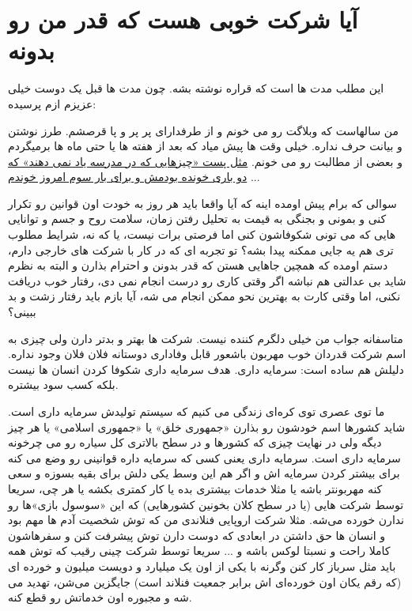 \section{آیا شرکت خوبی هست که قدر من رو بدونه}
این مطلب مدت ها است که قراره نوشته بشه. چون مدت ها قبل یک دوست خیلی عزیزم ازم پرسیده:
\begin{mdframed}
من سالهاست که وبلاگت رو می خونم و از طرفدارای پر پر و پا قرصشم. طرز نوشتن و بیانت حرف نداره. خیلی وقت ها پیش میاد که بعد از هفته ها یا حتی ماه ها برمیگردم و بعضی از مطالبت رو می خونم.
\href{http://jadi.net/2011/04/\%DA\%86\%DB\%8C\%D8\%B2\%D9\%87\%D8\%A7\%DB\%8C\%DB\%8C-\%DA\%A9\%D9\%87-\%D8\%AF\%D8\%B1-\%D9\%85\%D8\%AF\%D8\%B1\%D8\%B3\%D9\%87-\%DB\%8C\%D8\%A7\%D8\%AF-\%D9\%86\%D9\%85\%DB\%8C-\%D8\%AF\%D9\%87\%D9\%86\%D8\%AF/}{مثل پست «چیزهایی که در مدرسه یاد نمی دهند» که دو باری خونده بودمش و برای بار سوم امروز خوندم}
...

سوالی که برام پیش اومده اینه که آیا واقعا باید هر روز به خودت اون قوانین رو تکرار کنی و بمونی و بجنگی به قیمت به تحلیل رفتن زمان، سلامت روح و جسم و توانایی هایی که می تونی شکوفاشون کنی اما فرصتی برات نیست، یا که نه، شرایط مطلوب تری هم یه جایی ممکنه پیدا بشه؟
تو تجربه ای که در کار با شرکت های خارجی دارم، دستم اومده که همچین جاهایی هستن که قدر بدونن و احترام بذارن و البته به نظرم شاید بی عدالتی هم نباشه اگر وقتی کاری رو درست انجام نمی دی، رفتار خوب دریافت نکنی، اما وقتی کارت به بهترین نحو ممکن انجام می شه، آیا بازم باید رفتار زشت و بد ببینی؟
\end{mdframed}
متاسفانه جواب من خیلی دلگرم کننده نیست. شرکت ها بهتر و بدتر دارن ولی چیزی به اسم شرکت قدردان خوب مهربون باشعور قابل وفاداری دوستانه فلان فلان وجود نداره. دلیلش هم ساده است: سرمایه داری. هدف سرمایه داری شکوفا کردن انسان ها نیست بلکه کسب سود بیشتره.

ما توی عصری توی کره‌ای زندگی می کنیم که سیستم تولیدش سرمایه داری است. شاید کشورها اسم خودشون رو بذارن «جمهوری خلق» یا «جمهوری اسلامی» یا هر چیز دیگه ولی در نهایت چیزی که کشورها و در سطح بالاتری کل سیاره رو می چرخونه سرمایه داری است. سرمایه داری یعنی کسی که سرمایه داره قوانینی رو وضع می کنه برای بیشتر کردن سرمایه اش و اگر هم این وسط یکی دلش برای بقیه بسوزه و سعی کنه مهربونتر باشه یا مثلا خدمات بیشتری بده یا کار کمتری بکشه یا هر چی، سریعا توسط شرکت هایی (یا در سطح کلان بخونین کشورهایی) که این «سوسول بازی»ها رو ندارن خورده می‌شه. مثلا شرکت اروپایی فنلاندی من که توش شخصیت آدم ها مهم بود و انسان ها حق داشتن در ابعادی که دوست دارن توش پیشرفت کنن و سفرهاشون کاملا راحت و نسبتا لوکس باشه و ... سریعا توسط شرکت چینی رقیب که توش همه باید مثل سرباز کار کنن وگرنه با یکی از اون یک میلیارد و دویست میلیون و خورده ای (که رقم یکان اون خورده‌ای اش برابر جمعیت فنلاند است) جایگزین می‌شن، تهدید می شه و مجبوره اون خدماتش رو قطع کنه.


